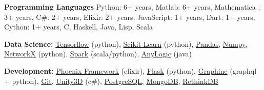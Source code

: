 \textbf{Programming Languages}
Python: 6+ years, Matlab: 6+ years, Mathematica : 3+ years, C\#: 2+
years, Elixir: 2+ years, JavaScript: 1+ years, Dart: 1+ years, Cython:
1+ years, C, Haskell, Java, Lisp, Scala



\textbf{Data Science:} \href{https://www.tensorflow.org/}{Tensorflow}
(python), \href{http://scikit-learn.org}{Scikit Learn} (python),
\href{http://pandas.pydata.org/}{Pandas},
\href{http://www.numpy.org/}{Numpy},
\href{https://networkx.github.io/}{NetworkX} (python),
\href{http://spark.apache.org/}{Spark} (scala/python),
\href{http://www.anylogic.com/}{AnyLogic} (java)

\textbf{Development:} \href{http://www.phoenixframework.org/}{Phoenix
Framework} (elixir), \href{http://flask.pocoo.org/}{Flask} (python),
\href{http://graphene-python.org/}{Graphine} (graphql + python),
\href{https://git-scm.com/}{Git}, \href{https://unity3d.com/}{Unity3D}
(c\#), \href{https://www.postgresql.org/}{PostgreSQL},
\href{https://www.mongodb.com/}{MongoDB},
\href{https://github.com/rethinkdb/rethinkdb}{RethinkDB}

